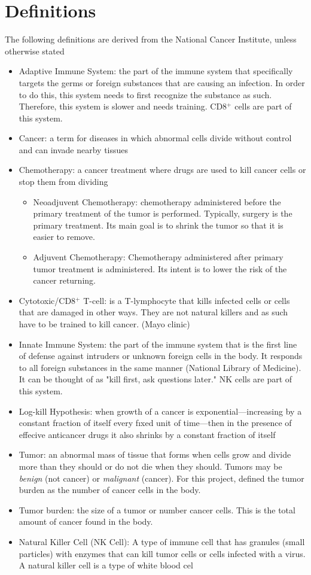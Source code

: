 \documentclass[11pt]{amsart}
\begin{document}
\section{Definitions}
\label{appendix: defs}
The following definitions are derived from the National Cancer Institute, unless otherwise stated
\begin{itemize}
	\item Adaptive Immune System: the part of the immune system that specifically targets the germs or foreign substances that are causing an infection. In order to do this, this system needs to first recognize the substance as such. Therefore, this system is slower and needs training. CD8$^+$ cells are part of this system.
	\item Cancer:  a term for diseases in which abnormal cells divide without control and can invade nearby tissues
	\item Chemotherapy: a cancer treatment where drugs are used to kill cancer cells or stop them from dividing
		\begin{itemize}
			\item Neoadjuvent Chemotherapy: chemotherapy administered before the primary treatment of the tumor is performed. Typically, surgery is the primary treatment. Its main goal is to shrink the tumor so that it is easier to remove.
			\item Adjuvent Chemotherapy: Chemotherapy administered after primary tumor treatment is administered. Its intent is to lower the risk of the cancer returning.
		\end{itemize}
	\item Cytotoxic/CD8$^+$ T-cell: is a T-lymphocyte that kills infected cells or cells that are damaged in other ways. They are not natural killers and as such have to be trained to kill cancer. (Mayo clinic)
	\item Innate Immune System: the part of the immune system that is the first line of defense against intruders or unknown foreign cells in the body. It responds to all foreign substances in the same manner (National Library of Medicine). It can be thought of as "kill first, ask questions later." NK cells are part of this system.
	\item Log-kill Hypothesis: when growth of a cancer is exponential—increasing by a constant fraction of itself every fıxed unit of time—then in the presence of effecive anticancer drugs it also shrinks by a constant fraction \cite{LogKill}
of itself
	\item Tumor: an abnormal mass of tissue that forms when cells grow and divide more than they should or do not die when they should. Tumors may be \textit{benign} (not cancer) or \textit{malignant} (cancer). For this project, defined the tumor burden as the number of cancer cells in the body.
	\item Tumor burden: the size of a tumor or number cancer cells. This is the total amount of cancer found in the body.
        \item Natural Killer Cell (NK Cell): A type of immune cell that has granules (small particles) with enzymes that can kill tumor cells or cells infected with a virus. A natural killer cell is a type of white blood cel
\end{itemize}
\end{document}
